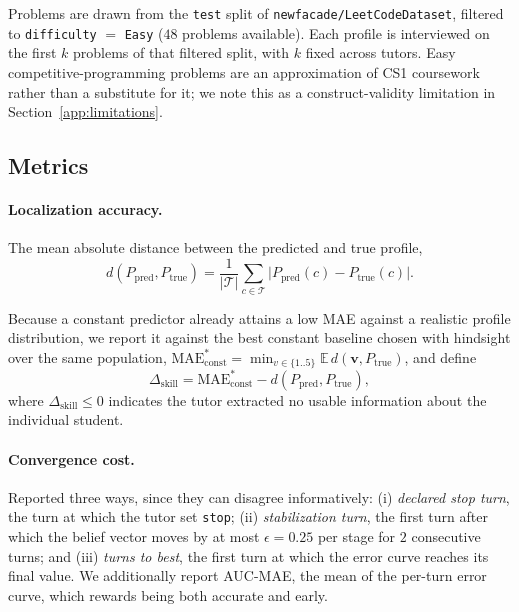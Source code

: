 Problems are drawn from the \texttt{test} split of
\texttt{newfacade/LeetCodeDataset}, filtered to \texttt{difficulty}
$=$ \texttt{Easy} ($48$ problems available). Each profile is interviewed on
the first $k$ problems of that filtered split, with $k$ fixed across tutors.
Easy competitive-programming problems are an approximation of CS1 coursework
rather than a substitute for it; we note this as a construct-validity
limitation in Section~\ref{app:limitations}.

\subsection{Metrics}
\label{app:metrics}

\paragraph{Localization accuracy.} The mean absolute distance between the
predicted and true profile,
\begin{equation}
d(P_{\text{pred}}, P_{\text{true}}) =
\frac{1}{|\mathcal{T}|} \sum_{c \in \mathcal{T}}
\bigl| P_{\text{pred}}(c) - P_{\text{true}}(c) \bigr| .
\end{equation}

Because a constant predictor already attains a low MAE against a realistic
profile distribution, we report it against the best constant baseline chosen
with hindsight over the same population,
$\text{MAE}^{*}_{\text{const}} = \min_{v \in \{1..5\}} \mathbb{E}\,
d(\mathbf{v}, P_{\text{true}})$, and define
\begin{equation}
\Delta_{\text{skill}} = \text{MAE}^{*}_{\text{const}} - d(P_{\text{pred}}, P_{\text{true}}),
\end{equation}
where $\Delta_{\text{skill}} \le 0$ indicates the tutor extracted no usable
information about the individual student.

\paragraph{Convergence cost.} Reported three ways, since they can disagree
informatively: (i) \emph{declared stop turn}, the turn at which the tutor set
\texttt{stop}; (ii) \emph{stabilization turn}, the first turn after which the
belief vector moves by at most $\epsilon = 0.25$ per stage for $2$ consecutive
turns; and (iii) \emph{turns to best}, the first turn at which the error curve
reaches its final value. We additionally report AUC-MAE, the mean of the
per-turn error curve, which rewards being both accurate and early.

